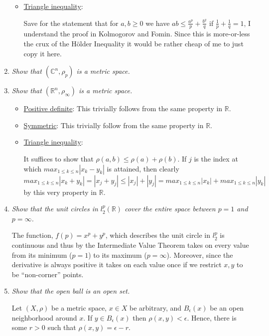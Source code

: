 \documentclass[11pt]{article}
\begin{document}
\begin{enumerate}
\begin{itemize}
\item \underline{Triangle inequality}:

Save for the statement that for $a,b \geq 0$ we have $ab \leq \frac{a^p}{p} + \frac{b^q}{q}$ if $\frac{1}{p} + \frac{1}{q} =1$, I understand the proof in Kolmogorov and Fomin.  Since this is more-or-less the crux of the H\"older Inequality it would be rather cheap of me to just copy it here.

\end{itemize}
\item \emph{Show that $(\mathbb{C}^n, \rho_p)$ is a metric space.}
\item \emph{Show that $(\mathbb{R}^n, \rho_\infty)$ is a metric space.}
\begin{itemize}
\item \underline{Positive definite}:
This trivially follows from the same property in $\mathbb{R}$.

\item \underline{Symmetric}:
This trivially follow from the same property in $\mathbb{R}$.
\item \underline{Triangle inequality}:

It suffices to show that $\rho(a,b) \leq \rho(a) + \rho(b)$.
If $j$ is the index at which $max_{1 \leq k \leq n}|x_k-y_k|$ is attained, then clearly $max_{1 \leq k \leq n}|x_k+y_k| = |x_j+y_j| \leq |x_j| + |y_j|=max_{1 \leq k \leq n}|x_k| +max_{1 \leq k \leq n}|y_k|$ by this very property in $\mathbb{R}$.

\end{itemize}

\item \emph{Show that the unit circles in $l_2^p(\mathbb{R})$ cover the entire space between $p=1$ and $p=\infty$.}

The function, $f(p)=x^p+y^p$, which describes the unit circle in $l_2^p$ is continuous and thus by the Intermediate Value Theorem takes on every value from its minimum ($p=1$) to its maximum ($p=\infty$).  Moreover, since the derivative is always positive it takes on each value once if we restrict $x,y$ to be ``non-corner'' points.

\item \emph{Show that the open ball is an open set.}

Let $(X,\rho)$ be a metric space, $x \in X$ be arbitrary, and $B_\epsilon(x)$ be an open neighborhood around $x$.  If $y \in B_\epsilon(x)$ then $\rho(x,y) < \epsilon$.  Hence, there is some $r>0$ such that $\rho(x,y) = \epsilon - r$.


\end{enumerate}
\end{document}
